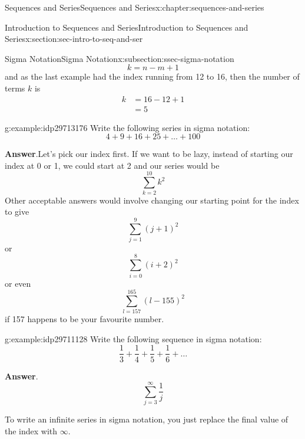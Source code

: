 \documentclass[twoside,10pt,]{book}
\newcommand{\blocktitlefont}{\relax}
\numberwithin{equation}{section}
\newcommand{\amp}{&}
\begin{document}
\begin{chapterptx}{Sequences and Series}{}{Sequences and Series}{}{}{x:chapter:sequences-and-series}
\begin{sectionptx}{Introduction to Sequences and Series}{}{Introduction to Sequences and Series}{}{}{x:section:sec-intro-to-seq-and-ser}
\begin{subsectionptx}{Sigma Notation}{}{Sigma Notation}{}{}{x:subsection:ssec-sigma-notation}
\begin{equation*}
k = n - m + 1
\end{equation*}
and as the last example had the index running from 12 to 16, then the number of terms \(k\) is%
\begin{align*}
k \amp = 16 - 12 + 1\\
\amp = 5
\end{align*}
\begin{example}{}{g:example:idp29713176}%
Write the following series in sigma notation:%
\begin{equation*}
4 + 9 + 16 + 25 +\ldots + 100
\end{equation*}
\par\smallskip%
\noindent\textbf{\blocktitlefont Answer}.\label{g:answer:idp29714712}{}\hypertarget{g:answer:idp29714712}{}\quad{}Let's pick our index first.  If we want to be lazy, instead of starting our index at 0 or 1, we could start at 2 and our series would be%
\begin{equation*}
\sum\limits_{k = 2}^{10} {{k^2}}
\end{equation*}
Other acceptable answers would involve changing our starting point for the index to give%
\begin{equation*}
\sum\limits_{j = 1}^9 {{{\left( {j + 1} \right)}^2}}
\end{equation*}
or%
\begin{equation*}
\sum\limits_{i = 0}^8 {{{\left( {i + 2} \right)}^2}}
\end{equation*}
or even%
\begin{equation*}
\sum\limits_{l = 157}^{165} {{{\left( {l - 155} \right)}^2}}
\end{equation*}
if 157 happens to be your favourite number.\end{example}
 \begin{example}{}{g:example:idp29711128}%
Write the following sequence in sigma notation:%
\begin{equation*}
\frac{1}{3} + \frac{1}{4} + \frac{1}{5} + \frac{1}{6} + \ldots
\end{equation*}
\par\smallskip%
\noindent\textbf{\blocktitlefont Answer}.\label{g:answer:idp29712792}{}\hypertarget{g:answer:idp29712792}{}\quad{}%
\begin{equation*}
\sum\limits_{j = 3}^\infty  {\frac{1}{j}}
\end{equation*}
\end{example}
%
\par
To write an infinite series in sigma notation, you just replace the final value of the index with \(\infty\).%

\end{subsectionptx}
\end{sectionptx}
\end{chapterptx}
\end{document}
